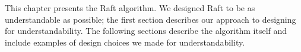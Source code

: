 This chapter presents the Raft algorithm. We designed Raft to be
as understandable as possible; the first section describes our approach
to designing for understandability. The following sections describe the
algorithm itself and include examples of design choices we made for
understandability.
